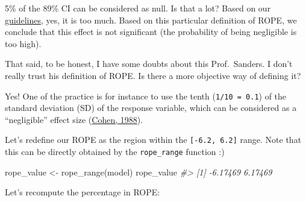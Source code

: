 \documentclass[10pt,a4paper,onecolumn]{article}
\newenvironment{Shaded}{\begin{snugshade}}{\end{snugshade}}
\newcommand{\AttributeTok}[1]{\textcolor[rgb]{0.77,0.63,0.00}{#1}}
\newcommand{\CommentTok}[1]{\textcolor[rgb]{0.56,0.35,0.01}{\textit{#1}}}
\newcommand{\FloatTok}[1]{\textcolor[rgb]{0.00,0.00,0.81}{#1}}
\newcommand{\FunctionTok}[1]{\textcolor[rgb]{0.00,0.00,0.00}{#1}}
\newcommand{\NormalTok}[1]{#1}
\newcommand{\OtherTok}[1]{\textcolor[rgb]{0.56,0.35,0.01}{#1}}
\newcommand{\SpecialCharTok}[1]{\textcolor[rgb]{0.00,0.00,0.00}{#1}}
\begin{document}
5\% of the 89\% CI can be considered as null. Is that a lot? Based on
our
\href{https://easystats.github.io/bayestestR/articles/guidelines.html}{guidelines},
yes, it is too much. Based on this particular definition of ROPE, we
conclude that this effect is not significant (the probability of being
negligible is too high).

That said, to be honest, I have some doubts about this Prof.~Sanders. I
don't really trust his definition of ROPE. Is there a more objective way
of defining it?

Yes! One of the practice is for instance to use the tenth
(\texttt{1/10\ =\ 0.1}) of the standard deviation (SD) of the response
variable, which can be considered as a ``negligible'' effect size
(\protect\hyperlink{ref-cohen1988statistical}{Cohen, 1988}).

\begin{Shaded}
\end{Shaded}

Let's redefine our ROPE as the region within the
\texttt{{[}-6.2,\ 6.2{]}} range. Note that this can be directly obtained
by the \texttt{rope\_range} function :)

\begin{Shaded}
\begin{Highlighting}[]
\NormalTok{rope\_value }\OtherTok{\textless{}{-}} \FunctionTok{rope\_range}\NormalTok{(model)}
\NormalTok{rope\_value}
\CommentTok{\#\textgreater{} [1] {-}6.17469  6.17469}
\end{Highlighting}
\end{Shaded}

Let's recompute the percentage in ROPE:

\begin{Shaded}
\end{Shaded}
\end{document}
